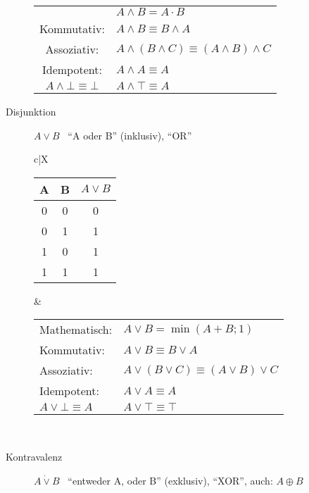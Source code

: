 \begin{description}
\begin{description}
\begin{tabularx}{\linewidth}{c|X}
\begin{tabular}[t]{ll}
                Mathematisch:               & $A \wedge B = A \cdot B$                             \\
                Kommutativ:                 & $A \wedge B \equiv B \wedge A$                       \\
                Assoziativ:                 & $A \wedge (B \wedge C) \equiv (A \wedge B) \wedge C$ \\
                Idempotent:                 & $A \wedge A \equiv A$                                \\
                $A \wedge \bot \equiv \bot$ & $A \wedge \top \equiv A$
            \end{tabular} \\ \hline
        \end{tabularx}
        \item[Disjunktion] $A\vee B$ \, ``A oder B'' (inklusiv), ``OR'' \\
        \begin{tabularx}{\linewidth}{c|X}
            \begin{tabular}[t]{c|c||c}
                A & B & $A \vee B$ \\ \hline\hline
                0 & 0 & 0          \\ \hline
                0 & 1 & 1          \\ \hline
                1 & 0 & 1          \\ \hline
                1 & 1 & 1
            \end{tabular} &
            \begin{tabular}[t]{ll}
                Mathematisch:           & $A \vee B = \min(A+B;1)$                     \\
                Kommutativ:             & $A \vee B \equiv B \vee A$                   \\
                Assoziativ:             & $A \vee (B \vee C) \equiv (A \vee B) \vee C$ \\
                Idempotent:             & $A \vee A \equiv A$                          \\
                $A \vee \bot \equiv A $ & $A \vee \top \equiv \top$
            \end{tabular} \\ \hline
        \end{tabularx}
        \item[Kontravalenz] $A\dot{\vee}B$ \, ``entweder A, oder B'' (exklusiv), ``XOR'', auch: $A\oplus B$ \\

\end{description}
\end{description}
